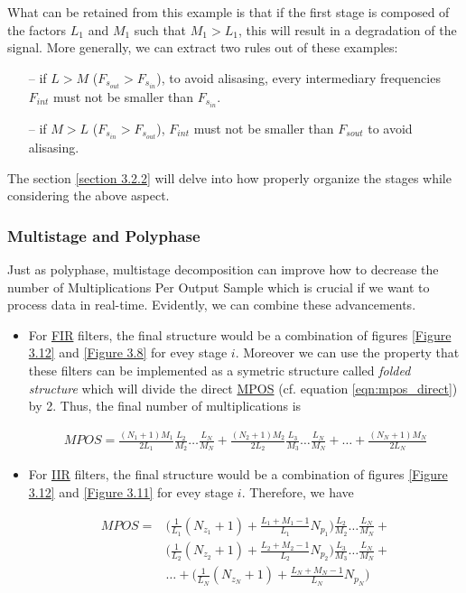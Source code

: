 \begin{itemize}
What can be retained from this example is that if the first stage is composed of the factors $L_1$ and  $M_1$ such that $M_1 > L_1$, this will result in a degradation of the signal. More generally, we can extract two rules out of these examples:
\begin{itemize}\label{3.1.4.2.conclusion}
	\item[--] if $L > M$ ($F_{s_{out}} > F_{s_{in}}$), to avoid alisasing, every intermediary frequencies $F_{int}$ must not be smaller than $F_{s_{in}}$.
	\item[--] if $M > L$ ($F_{s_{in}} > F_{s_{out}}$), $F_{int}$ must not be smaller than $F_{sout}$ to avoid alisasing. 
\end{itemize}
The section \ref{section 3.2.2} will delve into how properly organize the stages while considering the above aspect. 



\subsubsection{Multistage and Polyphase}

Just as polyphase, multistage decomposition can improve how to decrease the number of Multiplications Per Output Sample which is crucial if we want to process data in real-time. Evidently, we can combine these advancements. 

\begin{itemize}
	\item For \hyperlink{FIR}{FIR} filters, the final structure would be a combination of figures \ref{Figure 3.12} and \ref{Figure 3.8} for evey stage $i$. Moreover we can use the property that these filters can be implemented as a symetric structure called \textit{folded structure} which will divide the direct \hyperlink{MPOS}{MPOS} (cf. equation \ref{eqn:mpos_direct}) by 2. Thus, the final number of multiplications is 
	
	\begin{align}
		MPOS = \frac{(N_1 + 1)M_1}{2L_1} \frac{L_2}{M_2}\dots\frac{L_N}{M_N} + \frac{(N_2 + 1)M_2}{2L_2} \frac{L_3}{M_3}\dots \frac{L_N}{M_N} + \dots +\frac{(N_N + 1)M_N}{2L_N} 
		\label{eqn:3.32}
	\end{align}
	\item For \hyperlink{IIR}{IIR} filters, the final structure would be a combination of figures \ref{Figure 3.12} and \ref{Figure 3.11} for evey stage $i$. Therefore, we have
	
	\begin{align}\label{eqn:3.33}
	MPOS =& \Big (\frac{1}{L_1} (N_{z_1} +1) + \frac{L_1+M_1-1}{L_1} N_{p_1} \Big ) \frac{L_2}{M_2}\dots\frac{L_N}{M_N} +  \nonumber\\ 
	&\Big (\frac{1}{L_2} (N_{z_2} +1) + \frac{L_2+M_2-1}{L_2} N_{p_2} \Big ) \frac{L_3}{M_3}\dots \frac{L_N}{M_N} + \\\nonumber
	&\dots +\Big (\frac{1}{L_N} (N_{z_N} +1) + \frac{L_N+M_N-1}{L_N} N_{p_N} \Big ) 
	\end{align}
	

\end{itemize}
\end{itemize}
